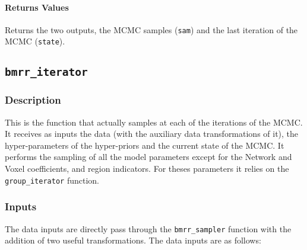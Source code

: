 \documentclass[
]{article}
\begin{document}
\paragraph{Returns Values}\label{returns-values}

Returns the two outputs, the MCMC samples (\texttt{sam}) and the last iteration of the
MCMC (\texttt{state}).

\subsection{\texorpdfstring{\texttt{bmrr\_iterator}}{bmrr\_iterator}}\label{bmrr_iterator}

\subsubsection{Description}\label{description}

This is the function that actually samples at each of the iterations of the
MCMC. It receives as inputs the data (with the auxiliary data transformations of
it), the hyper-parameters of the hyper-priors and the current state of the MCMC.
It performs the sampling of all the model parameters except for the Network and
Voxel coefficients, and region indicators. For theses parameters it relies on
the \texttt{group\_iterator} function.

\subsubsection{Inputs}\label{inputs-1}

The data inputs are directly pass through the \texttt{bmrr\_sampler} function with the
addition of two useful transformations. The data inputs are as follows:
\end{document}
